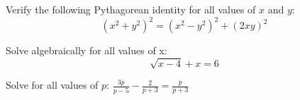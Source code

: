 \item %
Verify the following Pythagorean identity for all values of $x$ and $y$:
\[(x^2+y^2)^2=(x^2-y^2)^2+(2xy)^2\]


\item %
Solve algebraically for all values of x:
\[\sqrt{x-4}+x=6\]


\item %
Solve for all values of $p$:
$\displaystyle \frac{3p}{p-5}-\frac{2}{p+3}=\frac{p}{p+3}$
